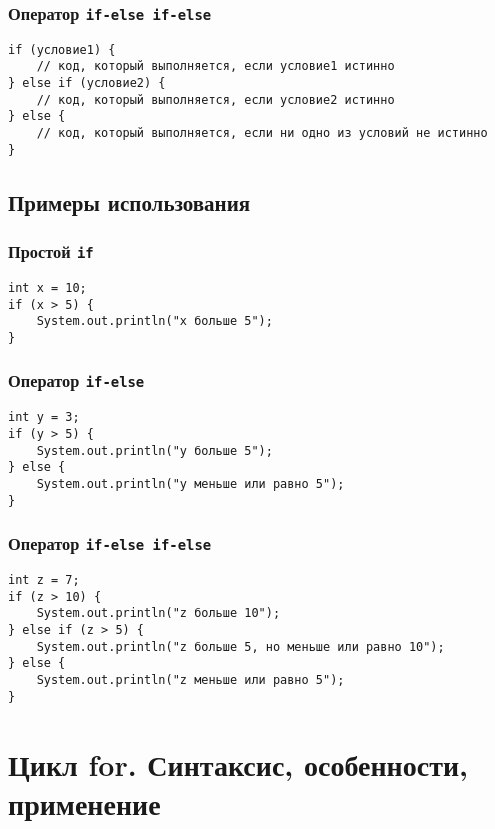 \documentclass[12pt, a4paper]{article}
\begin{document}
\subsubsection*{Оператор \texttt{if-else if-else}}

\begin{verbatim}
if (условие1) {
    // код, который выполняется, если условие1 истинно
} else if (условие2) {
    // код, который выполняется, если условие2 истинно
} else {
    // код, который выполняется, если ни одно из условий не истинно
}
\end{verbatim}

\subsection*{Примеры использования}

\subsubsection*{Простой \texttt{if}}

\begin{verbatim}
int x = 10;
if (x > 5) {
    System.out.println("x больше 5");
}
\end{verbatim}

\subsubsection*{Оператор \texttt{if-else}}

\begin{verbatim}
int y = 3;
if (y > 5) {
    System.out.println("y больше 5");
} else {
    System.out.println("y меньше или равно 5");
}
\end{verbatim}

\subsubsection*{Оператор \texttt{if-else if-else}}

\begin{verbatim}
int z = 7;
if (z > 10) {
    System.out.println("z больше 10");
} else if (z > 5) {
    System.out.println("z больше 5, но меньше или равно 10");
} else {
    System.out.println("z меньше или равно 5");
}
\end{verbatim}


\section{Цикл for. Синтаксис, особенности, применение}
\end{document}
